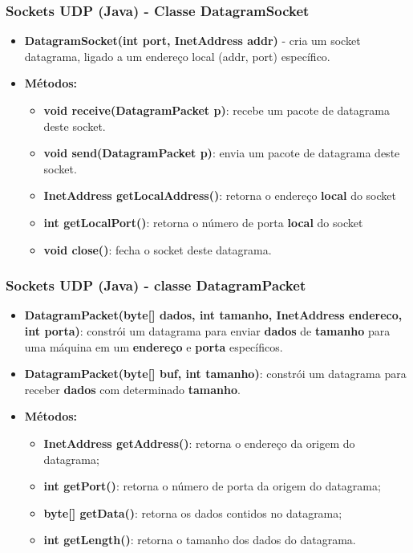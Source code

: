 \documentclass[hyperref={pdfpagelabels=false},table]{beamer}
\begin{document}
\begin{frame}[t]
\frametitle{Sockets UDP (Java) - Classe DatagramSocket}
	\begin{itemize}
	\item \textbf{DatagramSocket(int port, InetAddress addr)} - cria um socket datagrama, ligado a um endereço local (addr, port) específico.
	\item \textbf{Métodos:}
		\begin{itemize}
			\item \textbf{void receive(DatagramPacket p)}: recebe um pacote de datagrama deste socket.
			\item \textbf{void send(DatagramPacket p)}: envia um pacote de datagrama deste socket.
			\item \textbf{InetAddress getLocalAddress()}: retorna o endereço \textbf{local} do socket
			\item \textbf{int getLocalPort()}: retorna o número de porta \textbf{local} do socket
			\item \textbf{void close()}: fecha o socket deste datagrama.
		\end{itemize}
	\end{itemize}
\end{frame}

\begin{frame}[t]
	\frametitle{Sockets UDP (Java) - classe DatagramPacket}
	\begin{itemize}
		\item \textbf{DatagramPacket(byte[] dados, int tamanho, InetAddress endereco, int porta)}: constrói um datagrama para \alert{enviar} \textbf{dados} de \textbf{tamanho} para uma máquina em um \textbf{endereço} e \textbf{porta} específicos.
		\item \textbf{DatagramPacket(byte[] buf, int tamanho)}: constrói um datagrama para \alert{receber} \textbf{dados} com determinado \textbf{tamanho}.
 		\item \textbf{Métodos:}
		\begin{itemize}
			\item \textbf{InetAddress getAddress()}: retorna o endereço da origem do datagrama;
			\item \textbf{int getPort()}: retorna o número de porta da origem do datagrama;
			\item \textbf{byte[] getData()}: retorna os dados contidos no datagrama;
			\item \textbf{int getLength()}: retorna o tamanho dos dados do datagrama.
		\end{itemize}
	\end{itemize}
\end{frame}
\end{document}
